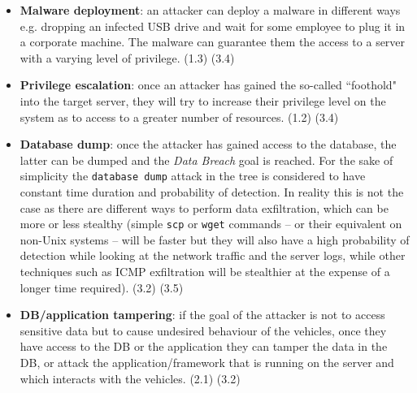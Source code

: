 \begin{itemize}
	\item \textbf{Malware deployment}: an attacker can deploy a malware in different ways e.g. dropping an infected USB drive and wait for some employee to plug it in a corporate machine. The malware can guarantee them the access to a server with a varying level of privilege. (1.3) (3.4)
	
	\item \textbf{Privilege escalation}: once an attacker has gained the so-called ``foothold" into the target server, they will try to increase their privilege level on the system as to access to a greater number of resources. (1.2) (3.4)	
	
	\item \textbf{Database dump}: once the attacker has gained access to the database, the latter can be dumped and the \textit{Data Breach} goal is reached. For the sake of simplicity the \texttt{database dump} attack in the tree is considered to have constant time duration and probability of detection. In reality this is not the case as there are different ways to perform data exfiltration, which can be more or less stealthy (simple \texttt{scp} or \texttt{wget} commands -- or their equivalent on non-Unix systems -- will be faster but they will also have a high probability of detection while looking at the network traffic and the server logs, while other techniques such as ICMP exfiltration will be stealthier at the expense of a longer time required). (3.2) (3.5)
	
	\item \textbf{DB/application tampering}: if the goal of the attacker is not to access sensitive data but to cause undesired behaviour of the vehicles, once they have access to the DB or the application they can tamper the data in the DB, or attack the application/framework that is running on the server and which interacts with the vehicles. (2.1) (3.2)
\end{itemize}